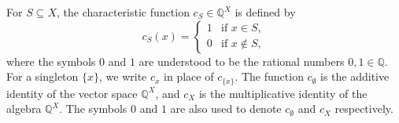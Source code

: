 For $S \subseteq X$, the characteristic function $c_S \in \mathbb{Q}^X$ is defined by
$$c_S(x) = \begin{cases} 1 & \text{if } x \in S, \\ 0 & \text{if } x \notin S, \end{cases}$$
where the symbols $0$ and $1$ are understood to be the rational numbers $0, 1 \in \mathbb{Q}$. For a singleton $\{x\}$, we write $c_x$ in place of $c_{\{x\}}$. The function $c_\emptyset$ is the additive identity of the vector space $\mathbb{Q}^X$, and $c_X$ is the multiplicative identity of the algebra $\mathbb{Q}^X$. The symbols $0$ and $1$ are also used to denote $c_\emptyset$ and $c_X$ respectively.
